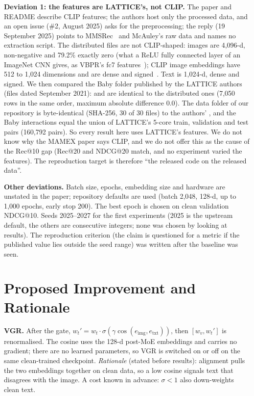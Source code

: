 \documentclass[conference]{IEEEtran}
\newcommand{\code}[1]{\texttt{\detokenize{#1}}}
\begin{document}
\textbf{Deviation 1: the features are LATTICE's, not CLIP.} The paper and README describe CLIP features; the authors host only the processed data, and an open issue (\#2, August 2025) asks for the preprocessing; the reply (19 September 2025) points to MMSRec~\cite{mmsrec} and McAuley's raw data and names no extraction script. The distributed files are not CLIP-shaped: images are 4,096-d, non-negative and 79.2\% exactly zero (what a ReLU fully connected layer of an ImageNet CNN gives, as VBPR's fc7 features~\cite{he2016vbpr}); CLIP image embeddings have 512 to 1,024 dimensions and are dense and signed~\cite{radford2021clip}. Text is 1,024-d, dense and signed. We then compared the Baby folder published by the LATTICE authors~\cite{zhang2021lattice} (files dated September 2021): \code{image_feat.npy} and \code{text_feat.npy} are identical to the distributed ones (7,050 rows in the same order, maximum absolute difference 0.0). The data folder of our repository is byte-identical (SHA-256, 30 of 30 files) to the authors' \code{processed\_data\_baby.zip}, and the Baby interactions equal the union of LATTICE's 5-core train, validation and test pairs (160,792 pairs). So every result here uses LATTICE's features. We do not know why the MAMEX paper says CLIP, and we do not offer this as the cause of the Rec@10 gap (Rec@20 and NDCG@20 match, and no experiment varied the features). The reproduction target is therefore ``the released code on the released data''.

\textbf{Other deviations.} Batch size, epochs, embedding size and hardware are unstated in the paper; repository defaults are used (batch 2,048, 128-d, up to 1,000 epochs, early stop 200). The best epoch is chosen on clean validation NDCG@10. Seeds 2025--2027 for the first experiments (2025 is the upstream default, the others are consecutive integers; none was chosen by looking at results). The reproduction criterion (the claim is questioned for a metric if the published value lies outside the seed range) was written after the baseline was seen.

\section{Proposed Improvement and Rationale}

\textbf{VGR.} After the gate, $w_t' = w_t \cdot \sigma(\gamma \cos(e_{\text{img}}, e_{\text{txt}}))$, then $[w_v, w_t']$ is renormalised. The cosine uses the 128-d post-MoE embeddings and carries no gradient; there are no learned parameters, so VGR is switched on or off on the same clean-trained checkpoint. \emph{Rationale} (stated before results): alignment pulls the two embeddings together on clean data, so a low cosine signals text that disagrees with the image. A cost known in advance: $\sigma<1$ also down-weights clean text.
\end{document}
